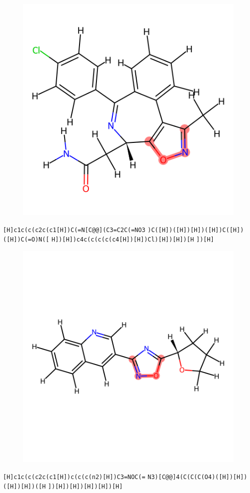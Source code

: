 \documentclass{article}
\begin{document}
\begin{figure}[ht]
\centering
    \includegraphics{mol166.png}
\end{figure}
\verb|[H]c1c(c(c2c(c1[H])C(=N[C@@](C3=C2C(=NO3| \verb|)C([H])([H])[H])([H])C([H])([H])C(=O)N([| \verb|H])[H])c4c(c(c(c(c4[H])[H])Cl)[H])[H])[H| \verb|])[H]|

\begin{figure}[ht]
\centering
    \includegraphics{mol167.png}
\end{figure}
\verb|[H]c1c(c(c2c(c1[H])c(c(c(n2)[H])C3=NOC(=| \verb|N3)[C@@]4(C(C(C(O4)([H])[H])([H])[H])([H| \verb|])[H])[H])[H])[H])[H]|
\end{document}
